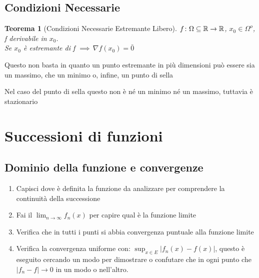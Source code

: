 \documentclass[a4paper]{article}
\newcommand{\numberset}{\mathbb}
\newcommand{\R}{\numberset{R}}
\theoremstyle{plain}
\newtheorem{Teo}{Teorema}
\begin{document}



\subsection{Condizioni Necessarie}

\begin{Teo}[Condizioni Necessarie Estremante Libero]    
    $\\f\colon\Omega\subseteq\R\to\R$, $ x_0\in\Omega^o$, f derivabile in $x_0$.\\
    Se $x_0$ è estremante di f $\implies \, \nabla f(x_0)=\bar{0}$ 
\end{Teo}

Questo non basta in quanto un punto estremante in più dimensioni può essere sia 
un massimo, che un minimo o, infine, un punto di sella 

Nel caso del punto di sella questo non è né un minimo né un massimo, tuttavia è stazionario 

\section{Successioni di funzioni}

\subsection{Dominio della funzione e convergenze}

\begin{enumerate}
    \item Capisci dove è definita la funzione da analizzare per comprendere 
    la continuità della successione
    \item Fai il $\lim_{n \to \infty} f_n(x)$ per capire qual è la funzione limite
    \item Verifica che in tutti i punti si abbia convergenza puntuale alla funzione limite
    \item Verifica la convergenza uniforme con: $\sup_{x\in E}|f_n(x)-f(x)|$,
    questo è eseguito cercando un modo per dimostrare o confutare che in ogni punto che $|f_n-f|
    \to 0$ in un modo o nell'altro. 
\end{enumerate}
\end{document}
